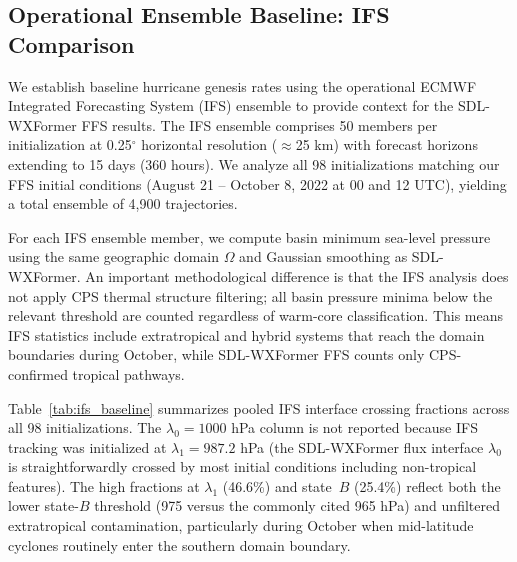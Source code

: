 \documentclass[11pt]{article}
\begin{document}
\subsection{Operational Ensemble Baseline: IFS Comparison}

We establish baseline hurricane genesis rates using the operational ECMWF Integrated Forecasting System (IFS) ensemble to provide context for the SDL-WXFormer FFS results. The IFS ensemble comprises 50 members per initialization at 0.25$^\circ$ horizontal resolution ($\approx$25 km) with forecast horizons extending to 15 days (360 hours). We analyze all 98 initializations matching our FFS initial conditions (August 21 -- October 8, 2022 at 00 and 12 UTC), yielding a total ensemble of 4,900 trajectories.

For each IFS ensemble member, we compute basin minimum sea-level pressure using the same geographic domain $\Omega$ and Gaussian smoothing as SDL-WXFormer. An important methodological difference is that the IFS analysis does not apply CPS thermal structure filtering; all basin pressure minima below the relevant threshold are counted regardless of warm-core classification. This means IFS statistics include extratropical and hybrid systems that reach the domain boundaries during October, while SDL-WXFormer FFS counts only CPS-confirmed tropical pathways.

Table~\ref{tab:ifs_baseline} summarizes pooled IFS interface crossing fractions across all 98 initializations. The $\lambda_0 = 1000$ hPa column is not reported because IFS tracking was initialized at $\lambda_1 = 987.2$ hPa (the SDL-WXFormer flux interface $\lambda_0$ is straightforwardly crossed by most initial conditions including non-tropical features). The high fractions at $\lambda_1$ (46.6\%) and state~$B$ (25.4\%) reflect both the lower state-$B$ threshold (975 versus the commonly cited 965 hPa) and unfiltered extratropical contamination, particularly during October when mid-latitude cyclones routinely enter the southern domain boundary.
\end{document}
